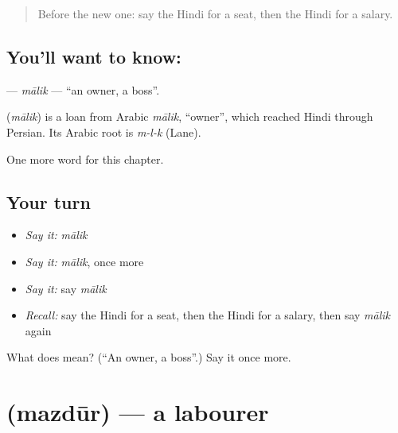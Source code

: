 \label{lesson:HI-C182-malik}



\begin{quote}
Before the new one: say the Hindi for a seat, then the Hindi for a salary.
\end{quote}

\subsection*{You'll want to know: }
\textbf{} — \emph{mālik} — \textquotedblleft{}an owner, a boss\textquotedblright{}.

\begin{cousinweb}
\textbf{} (\emph{mālik}) is a loan from Arabic \emph{mālik}, \textquotedblleft{}owner\textquotedblright{}, which reached Hindi through Persian. Its Arabic root is \emph{m-l-k} (Lane).
\end{cousinweb}

\begin{grammarlens}[title={What you've built}]
One more word for this chapter.
\end{grammarlens}

\subsection*{Your turn}
\begin{itemize}
\raggedright
  \item \emph{Say it:} \emph{mālik}
  \item \emph{Say it:} \emph{mālik}, once more
  \item \emph{Say it:} say \emph{mālik}
  \item \emph{Recall:} say the Hindi for a seat, then the Hindi for a salary, then say \emph{mālik} again
\end{itemize}

\begin{tcolorbox}[breakable,colback=teal!4,colframe=teal!35!black,title={Before you move on}]
What does  mean? (\textquotedblleft{}An owner, a boss\textquotedblright{}.) Say it once more.
\end{tcolorbox}
\section[\texorpdfstring{\hi{मज़दूर} (mazdūr)}{मज़दूर (mazdūr)}]{ (mazdūr) — a labourer}

\label{lesson:HI-C182-mazdur}



